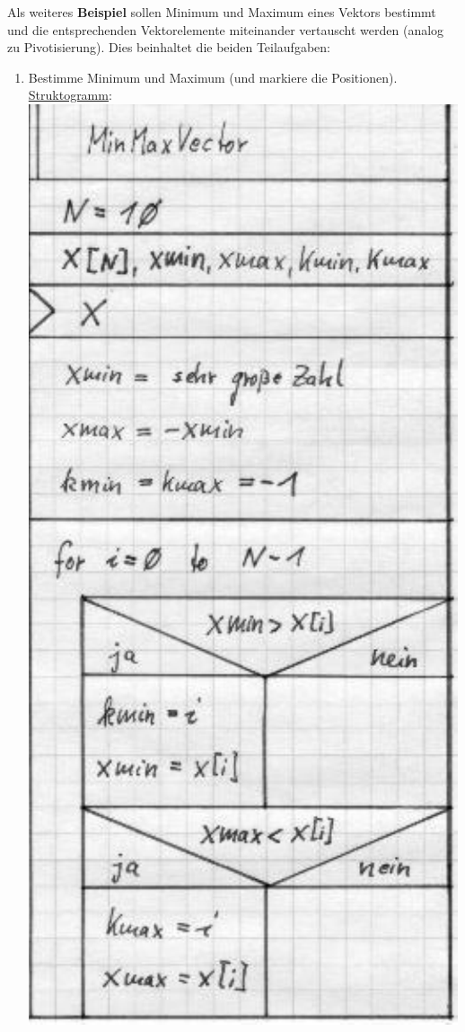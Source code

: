 Als weiteres \textbf{Beispiel} sollen Minimum und Maximum eines
Vektors bestimmt und die entsprechenden Vektorelemente
miteinander vertauscht werden (analog zu Pivotisierung).
Dies beinhaltet die beiden Teilaufgaben:
%
%
\begin{enumerate}
\renewcommand {\labelenumi}{\alph{enumi})}
 \item Bestimme Minimum und Maximum (und markiere die Positionen).
\\
%
\underline{Struktogramm}: \\
\includegraphics[scale=0.7]{GIF/p49a}


\end{enumerate}
